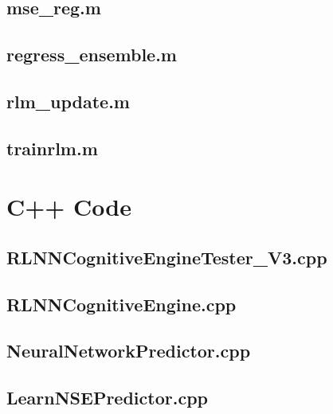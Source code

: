 \section{mse\_reg.m}\label{app:MatlabCode:mseReg}

\section{regress\_ensemble.m}\label{app:MatlabCode:regressEnsemble}

\clearpage
\section{rlm\_update.m}\label{app:MatlabCode:rlmUpdate}

\clearpage
\section{trainrlm.m}\label{app:MatlabCode:trainrlm}

\clearpage

\chapter{C++ Code} \label{app:CppCode}
\section{RLNNCognitiveEngineTester\_V3.cpp}\label{app:CppCode:cogEngTesterV3}

\clearpage
\section{RLNNCognitiveEngine.cpp}\label{app:CppCode:cogEng}

\clearpage
\section{NeuralNetworkPredictor.cpp}\label{app:CppCode:nnPredictor}

\clearpage
\section{LearnNSEPredictor.cpp} \label{app:CppCode:LearnNSE}

\clearpage
